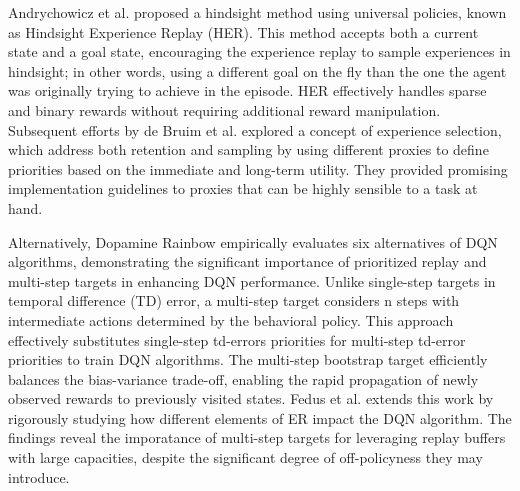 Andrychowicz et al. \cite{andrychowicz2017hindsight} proposed a hindsight method using universal policies, known as Hindsight Experience Replay (HER). This method accepts both a current state and a goal state, encouraging the experience replay to sample experiences in hindsight; in other words, using a different goal on the fly than the one the agent was originally trying to achieve in the episode. HER effectively handles sparse and binary rewards without requiring additional reward manipulation. Subsequent efforts by de Bruim et al. \cite{de2018experience} explored a concept of experience selection, which address both retention and sampling by using different proxies to define priorities based on the immediate and long-term utility. They provided promising implementation guidelines to proxies that can be highly sensible to a task at hand. 






Alternatively, Dopamine Rainbow \cite{hessel2018rainbow} empirically evaluates six alternatives of DQN algorithms, demonstrating the significant importance of prioritized replay and multi-step targets in enhancing DQN performance. Unlike single-step targets in temporal difference (TD) error, a multi-step target considers n steps with intermediate actions determined by the behavioral policy. This approach effectively substitutes single-step td-errors priorities for multi-step td-error priorities to train DQN algorithms. The multi-step bootstrap target \cite{sutton1988learning, sutton2018reinforcement} efficiently balances the bias-variance trade-off, enabling the rapid propagation of newly observed rewards to previously visited states. Fedus et al. \cite{fedus2020revisiting} extends this work by rigorously studying how different elements of ER impact the DQN algorithm. The findings reveal the imporatance of multi-step targets for leveraging replay buffers with large capacities, despite the significant degree of off-policyness they may introduce.

